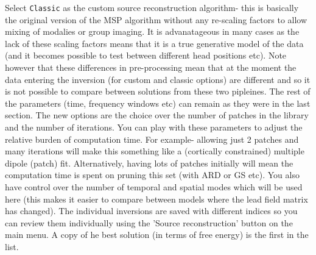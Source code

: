 Select \texttt{Classic} as the custom source reconstruction algorithm- this is basically the original version of the MSP algorithm without any re-scaling factors to allow mixing of modalies or group imaging. It is advanatageous in many cases as the lack of these scaling factors means that it is a true generative model of the data (and it becomes possible to test between different head positions etc). Note however that these differences in pre-processing mean that at the moment the data entering the inversion (for custom and classic options) are different and so it is not possible to compare between solutions from these two pipleines.
 The rest of the parameters (time, frequency windows etc) can remain as they were in the last section. The new options are the choice over the number of patches in the library  and the number of iterations. You can play with these parameters to adjust the relative burden of computation time. For example- allowing just 2 patches and many iterations will make this something like a (cortically constrained) multiple dipole (patch) fit. Alternatively, having lots of patches initially will mean the computation time is spent on pruning this set (with ARD or GS etc). 
You also have control over the number of temporal and spatial modes which will be used here (this makes it easier to compare between models where the lead field matrix has changed). 
The individual inversions are saved with different indices so you can review them individually using the 'Source reconstruction' button on the main menu. A copy of he best solution (in terms of free energy) is the first in the list.

